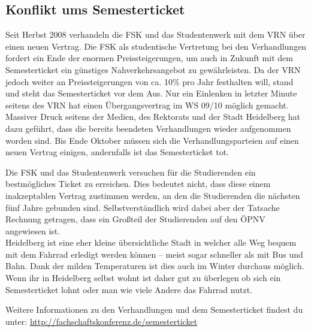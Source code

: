 \subsection{Konflikt ums Semesterticket}
Seit Herbst 2008 verhandeln die \gls{FSK} und das Studentenwerk mit dem VRN über einen neuen Vertrag. Die \gls{FSK} als studentische Vertretung bei den Verhandlungen fordert ein Ende der enormen Preissteigerungen, um auch in Zukunft mit dem Semesterticket ein günstiges Nahverkehrsangebot zu gewährleisten. Da der VRN jedoch weiter an Preissteigerungen von ca. 10\% pro Jahr festhalten will, stand und steht das Semesterticket vor dem Aus. Nur ein Einlenken in letzter Minute seitens des VRN hat einen Übergangsvertrag im WS 09/10 möglich gemacht. Massiver Druck seitens der Medien, des Rektorats und der Stadt Heidelberg hat dazu geführt, dass die bereits beendeten Verhandlungen wieder aufgenommen worden sind. Bis Ende Oktober müssen sich die Verhandlungsparteien auf einen neuen Vertrag einigen, andernfalls ist das Semesterticket tot.

Die \gls{FSK} und das Studentenwerk versuchen für die Studierenden ein bestmögliches Ticket zu erreichen. Dies bedeutet nicht, dass diese einem inakzeptablen Vertrag zustimmen werden, an den die Studierenden die nächsten fünf Jahre gebunden sind. Selbstverständlich wird dabei aber der Tatsache Rechnung getragen, dass ein Großteil der Studierenden auf den ÖPNV angewiesen ist.\\[2mm]

Heidelberg ist eine eher kleine übersichtliche Stadt in welcher alle Weg bequem mit dem Fahrrad erledigt werden können -- meist sogar schneller als mit Bus und Bahn. Dank der milden Temperaturen ist dies auch im Winter durchaus möglich. Wenn ihr in Heidelberg selbst wohnt ist daher gut zu überlegen ob sich ein Semesterticket lohnt oder man wie viele Andere das Fahrrad nutzt.

Weitere Informationen zu den Verhandlungen und dem Semesterticket findest du unter: \url{http://fachschaftskonferenz.de/semesterticket}



